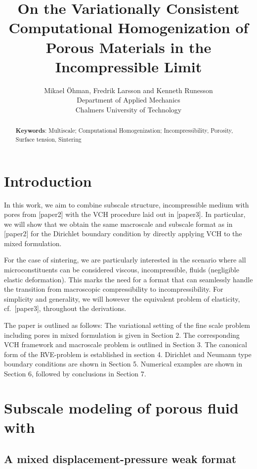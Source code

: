 \documentclass[12pt,a4paper]{article}
\title{On the Variationally Consistent Computational Homogenization of Porous Materials in the Incompressible Limit}
\author{
Mikael Öhman, Fredrik Larsson and Kenneth Runesson\\
Department of Applied Mechanics \\
Chalmers University of Technology}
\begin{document}
\maketitle
\begin{abstract}

\textbf{Keywords}:
Multiscale; Computational Homogenization; Incompressibility, Porosity, Surface tension, Sintering
\end{abstract}

\section{Introduction}

In this work, we aim to combine subscale structure, incompressible medium with pores from [paper2] with the VCH procedure laid out in [paper3].
In particular, we will show that we obtain the same macroscale and subscale format as in [paper2] for the Dirichlet boundary condition by directly applying VCH to the mixed formulation.

For the case of sintering, we are particularly interested in the scenario where all microconstituents can be considered viscous, incompressible, fluids (negligible elastic deformation).
This marks the need for a format that can seamlessly handle the transition from macroscopic compressibility to incompressibility.
For simplicity and generality, we will however the equivalent problem of elasticity, cf.\ [paper3], throughout the derivations.

The paper is outlined as follows:
The variational setting of the fine scale problem including pores in mixed formulation is given in Section 2.
The corresponding VCH framework and macroscale problem is outlined in Section 3.
The canonical form of the RVE-problem is established in section 4.
Dirichlet and Neumann type boundary conditions are shown in Section 5.
Numerical examples are shown in Section 6, followed by conclusions in Section 7.

\section{Subscale modeling of porous fluid with }

\subsection{A mixed displacement-pressure weak format}
\end{document}
